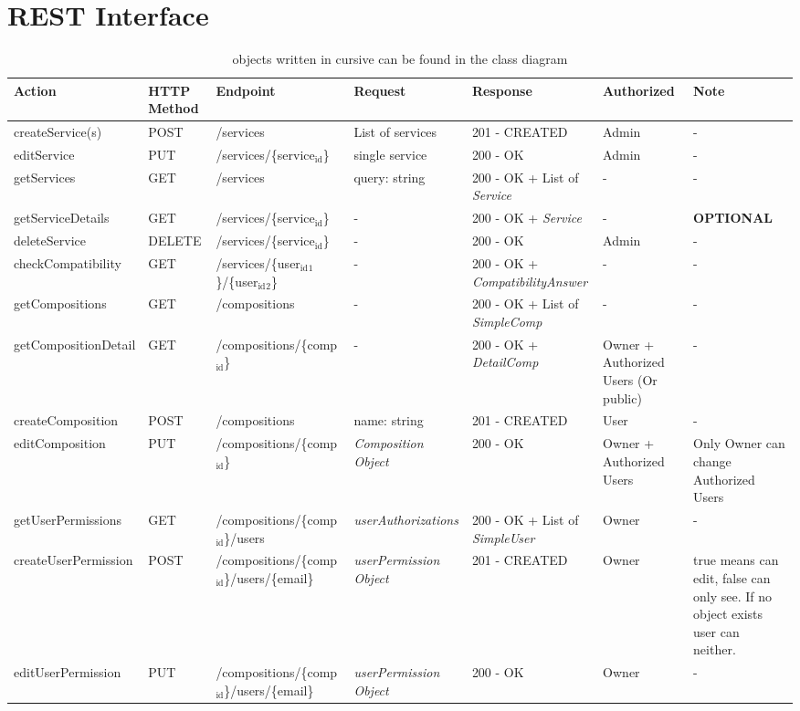 \documentclass[11pt]{article}
\author{Christian Richter}
\date{\today}
\title{}
\begin{document}
\section{REST Interface}
\label{sec:org7526752}
\begin{table}[htbp]
\caption{objects written in cursive can be found in the class diagram}
\centering
\begin{tabular}{lllllll}
Action & HTTP Method & Endpoint & Request & Response & Authorized & Note\\
\hline
createService(s) & POST & /services & List of services & 201 - CREATED & Admin & -\\
editService & PUT & /services/\{service\(_{\text{id}}\)\} & single service & 200 - OK & Admin & -\\
getServices & GET & /services & query: string & 200 - OK + List of \emph{Service} & - & -\\
getServiceDetails & GET & /services/\{service\(_{\text{id}}\)\} & - & 200 - OK + \emph{Service} & - & \textbf{OPTIONAL}\\
deleteService & DELETE & /services/\{service\(_{\text{id}}\)\} & - & 200 - OK & Admin & -\\
\hline
checkCompatibility & GET & /services/\{user\(_{\text{id}}\)\(_{\text{1}}\)\}/\{user\(_{\text{id}}\)\(_{\text{2}}\)\} & - & 200 - OK + \emph{CompatibilityAnswer} & - & -\\
\hline
getCompositions & GET & /compositions & - & 200 - OK + List of \emph{SimpleComp} & - & -\\
getCompositionDetail & GET & /compositions/\{comp\(_{\text{id}}\)\} & - & 200 - OK + \emph{DetailComp} & Owner + Authorized Users (Or public) & -\\
createComposition & POST & /compositions & name: string & 201 - CREATED & User & -\\
editComposition & PUT & /compositions/\{comp\(_{\text{id}}\)\} & \emph{Composition Object} & 200 - OK & Owner + Authorized Users & Only Owner can change Authorized Users\\
\hline
getUserPermissions & GET & /compositions/\{comp\(_{\text{id}}\)\}/users & \emph{userAuthorizations} & 200 - OK + List of \emph{SimpleUser} & Owner & -\\
createUserPermission & POST & /compositions/\{comp\(_{\text{id}}\)\}/users/\{email\} & \emph{userPermission Object} & 201 - CREATED & Owner & true means can edit, false can only see. If no object exists user can neither.\\
editUserPermission & PUT & /compositions/\{comp\(_{\text{id}}\)\}/users/\{email\} & \emph{userPermission Object} & 200 - OK & Owner & -\\

\end{tabular}
\end{table}
\end{document}
